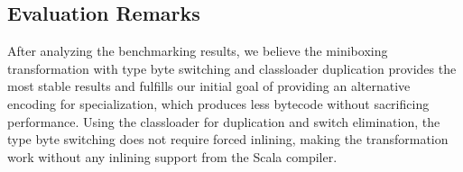 \subsection{Evaluation Remarks}
\label{subsec-eval-remarks}

After analyzing the benchmarking results, we believe the miniboxing transformation with type byte switching and classloader duplication provides the most stable results and fulfills our initial goal of providing an alternative encoding for specialization, which produces less bytecode without sacrificing performance. Using the classloader for duplication and switch elimination, the type byte switching does not require forced inlining, making the transformation work without any inlining support from the Scala compiler.
